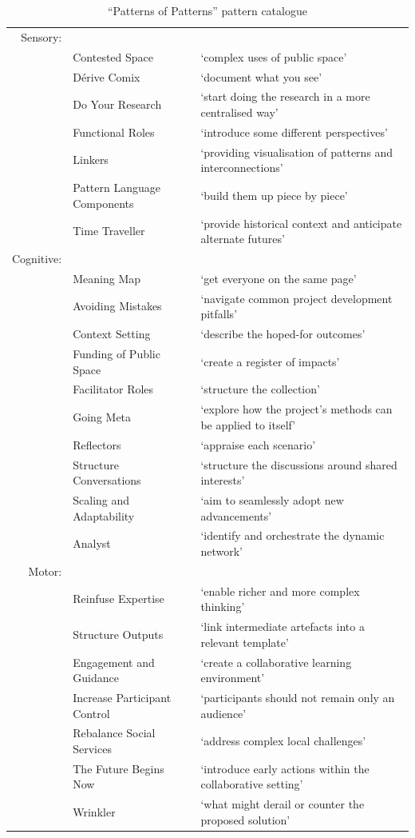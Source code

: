 \documentclass[acmlarge,timestamp]{acmart}
\begin{document}
\begin{table}
  \begin{tabular}{rll}
Sensory: &\\
&  {\sc Contested Space}& ‘complex uses of public space’ \\
&  {\sc Dérive Comix}& ‘document what you see’ \\
&  {\sc Do Your Research}& ‘start doing the research in a more centralised way’\\
&  {\sc Functional Roles}& ‘introduce some
different perspectives’ \\
&  {\sc Linkers}& ‘providing visualisation of patterns and interconnections’ \\
&  {\sc Pattern Language Components }& ‘build them up piece by piece’\\
&  {\sc Time Traveller }& ‘provide historical context and
anticipate alternate futures’\\
Cognitive: && \\
&  {\sc Meaning Map }& ‘get everyone on the same page’\\
&{\sc Avoiding Mistakes}& ‘navigate common project development pitfalls’\\
&{\sc Context Setting}& ‘describe the hoped-for outcomes’\\
&{\sc Funding of Public Space}& ‘create a register of impacts’\\
&{\sc Facilitator Roles}& ‘structure the collection’\\
&{\sc Going Meta}& ‘explore how the project’s methods can be applied to
itself’\\
&{\sc Reflectors}& ‘appraise each scenario’\\
&{\sc Structure Conversations}& ‘structure the discussions around shared interests’\\
&{\sc Scaling and Adaptability}& ‘aim to seamlessly adopt new advancements’\\
&{\sc Analyst }& ‘identify and orchestrate the dynamic network’ \\
Motor: && \\
&{\sc Reinfuse Expertise }& ‘enable richer and more complex thinking’\\
&{\sc Structure Outputs}& ‘link intermediate artefacts into a relevant template’\\
&{\sc Engagement and Guidance}& ‘create a
collaborative learning environment’\\
&{\sc Increase Participant Control}& ‘participants should not remain only an audience’\\
&{\sc Rebalance Social Services}& ‘address complex local challenges’\\
&{\sc The Future Begins Now}& ‘introduce early actions within the
collaborative setting’\\
&{\sc Wrinkler }& ‘what might derail or counter
the proposed solution’\\

  \end{tabular}
  \smallskip
  \caption{“Patterns of Patterns” pattern catalogue\label{summary}}
\end{table}
\end{document}

